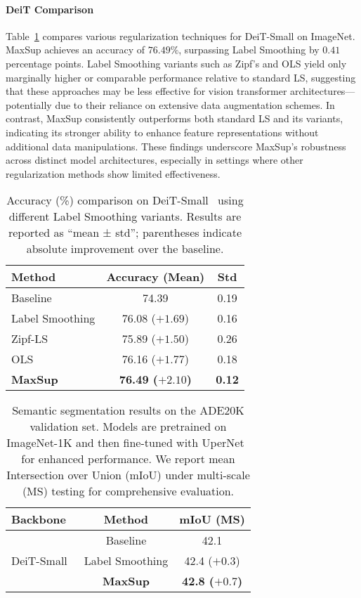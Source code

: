 \paragraph{DeiT Comparison}
Table~\ref{tab:deit-small-comparison} compares various regularization techniques for DeiT-Small on ImageNet. MaxSup achieves an accuracy of $76.49\%$, surpassing Label Smoothing by $0.41$ percentage points. Label Smoothing variants such as Zipf’s and OLS yield only marginally higher or comparable performance relative to standard LS, suggesting that these approaches may be less effective for vision transformer architectures—potentially due to their reliance on extensive data augmentation schemes. In contrast, MaxSup consistently outperforms both standard LS and its variants, indicating its stronger ability to enhance feature representations without additional data manipulations. These findings underscore MaxSup’s robustness across distinct model architectures, especially in settings where other regularization methods show limited effectiveness.

\begin{table}[t]
\centering
\scriptsize
\caption{Accuracy (\%) comparison on DeiT-Small~\citep{touvron2021training} using different Label Smoothing variants. 
Results are reported as ``mean ± std''; parentheses indicate absolute improvement over the baseline.}
\label{tab:deit-small-comparison}
\begin{tabular}{@{}lcc@{}}
\toprule
\textbf{Method} & \textbf{Accuracy (Mean)} & \textbf{Std} \\
\midrule
Baseline & 74.39 & 0.19 \\
Label Smoothing & 76.08 (\(+1.69\)) & 0.16 \\
Zipf-LS & 75.89 (\(+1.50\)) & 0.26 \\
OLS & 76.16 (\(+1.77\)) & 0.18 \\
\textbf{MaxSup} & \textbf{76.49 (\(+2.10\))} & \textbf{0.12} \\
\bottomrule
\end{tabular}
\vspace{-0.4cm}
\end{table}

\begin{table}[ht]
\centering
\scriptsize
\caption{Semantic segmentation results on the ADE20K validation set. Models are pretrained on ImageNet-1K and then fine-tuned with UperNet~\citep{xiao2018unified} for enhanced performance. We report mean Intersection over Union (mIoU) under multi-scale (MS) testing for comprehensive evaluation.}
\label{tab:miou}
\begin{tabular}{@{}lcc@{}}
\toprule
\textbf{Backbone} & \textbf{Method} & \textbf{mIoU (MS)} \\
\midrule
\multirow{3}{*}{DeiT-Small~\citep{touvron2021training}}  
 & Baseline & 42.1 \\
 & Label Smoothing & 42.4 (\(+0.3\)) \\
 & \textbf{MaxSup} & \textbf{42.8 (\(+0.7\))} \\
\bottomrule
\end{tabular}
\vspace{-0.5cm}
\end{table}


